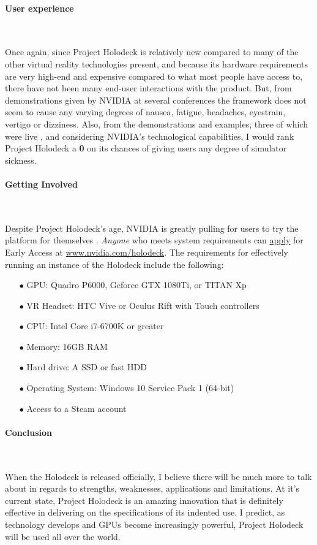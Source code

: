\documentclass[11pt]{article}
\begin{document}
\paragraph{User experience} ~ \par  
Once again, since Project Holodeck is relatively new compared to many of the other virtual reality technologies present, and because its hardware requirements are very high-end and expensive compared to what most people have access to, there have not been many end-user interactions with the product. But, from demonstrations given by NVIDIA at several conferences \cite{video1, video2, video3, video4} the framework does not seem to cause any varying degrees of nausea, fatigue, headaches, eyestrain, vertigo or dizziness. Also, from the demonstrations and examples, three of which were live \cite{video1, video3, video4}, and considering NVIDIA's technological capabilities, I would rank Project Holodeck a \textbf{0} on its chances of giving users any degree of simulator sickness.

\paragraph{Getting Involved} ~ \par
Despite Project Holodeck's age, NVIDIA is greatly pulling for users to try the platform for themselves \cite{nvidianews, nvidiablog2}. \emph{Anyone} who meets system requirements can \underline{apply} for Early Access at \url{www.nvidia.com/holodeck}. The requirements for effectively running an instance of the Holodeck include the following:
\begin{center}
\begin{enumerate}
\item[$\bullet$]GPU: Quadro P6000, Geforce GTX 1080Ti, or TITAN Xp
\item[$\bullet$]VR Headset: HTC Vive or Oculus Rift with Touch controllers
\item[$\bullet$]CPU: Intel Core i7-6700K or greater
\item[$\bullet$]Memory: 16GB RAM
\item[$\bullet$]Hard drive: A SSD or fast HDD
\item[$\bullet$]Operating System: Windows 10 Service Pack 1 (64-bit)
\item[$\bullet$]Access to a Steam account
\end{enumerate}
\end{center}

\paragraph{Conclusion} ~ \par 
When the Holodeck is released officially, I believe there will be much more to talk about in regards to strengths, weaknesses, applications and limitations. At it's current state, Project Holodeck is an amazing innovation that is definitely effective in delivering on the specifications of its indented use. I predict, as technology develops and GPUs become increasingly powerful, Project Holodeck will be used all over the world.
\end{document}
